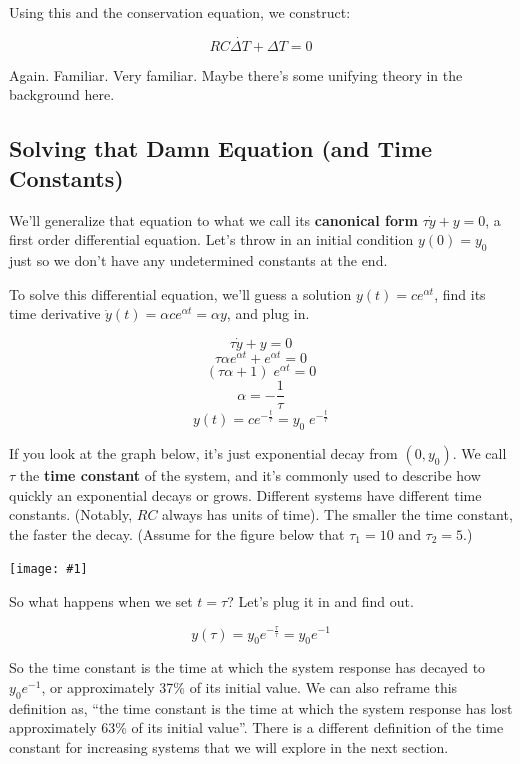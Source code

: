 \documentclass{article}
\newcommand{\bicture}[1]{
\begin{center}
    {\texttt{[image: \#1]}}
\end{center}}
\begin{document}
\begin{onehalfspacing}
\begin{flushleft}
Using this and the conservation equation, we construct:

\vspace{-0.1in}
\[\boxed{RC \dot{\Delta T} + \Delta T = 0}\]

Again. Familiar. Very familiar. Maybe there's some unifying theory in the background here.

\subsection{Solving that Damn Equation (and Time Constants)}

We'll generalize that equation to what we call its \textbf{canonical form} \(\tau \dot{y} + y = 0\), a first order differential equation. Let's throw in an initial condition \(y(0)=y_0\) just so we don't have any undetermined constants at the end.

\medskip

To solve this differential equation, we'll guess a solution \(y(t) = ce^{\alpha t}\), find its time derivative \(\dot{y}(t) = \alpha ce^{\alpha t} = \alpha y\), and plug in.

\vspace{-0.1in}
\[\tau \dot{y} + y = 0\]
\[\tau \alpha e^{\alpha t} + e^{\alpha t} = 0\]
\[(\tau \alpha + 1) \; e^{\alpha t} = 0\]
\[\alpha = -\frac{1}{\tau}\]
\[y(t) = ce^{-\frac{t}{\tau}} = y_0 \; e^{-\frac{t}{\tau}}\]

If you look at the graph below, it's just exponential decay from \((0, y_0)\). We call \(\tau\) the \textbf{time constant} of the system, and it's commonly used to describe how quickly an exponential decays or grows. Different systems have different time constants. (Notably, \(RC\) always has units of time). The smaller the time constant, the faster the decay. (Assume for the figure below that \(\tau_1 = 10\) and \(\tau_2 = 5\).)

\bicture{2_exp}

So what happens when we set \(t=\tau\)? Let's plug it in and find out.

\[y(\tau) = y_0 e^{-\frac{\tau}{\tau}} = y_0 e^{-1}\]

So the time constant is the time at which the system response has decayed to \(y_0 e^{-1}\), or approximately 37\% of its initial value. We can also reframe this definition as, ``the time constant is the time at which the system response has lost approximately 63\% of its initial value''. There is a different definition of the time constant for increasing systems that we will explore in the next section.


\end{flushleft}
\end{onehalfspacing}
\end{document}
